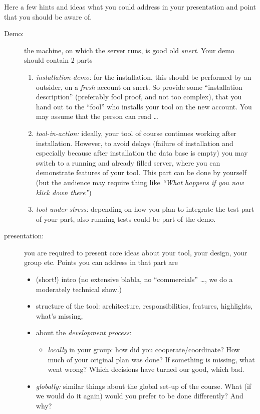 \documentclass[11pt,handout,nologo]{handout}
\begin{document}
Here a few hints and ideas what you could address in your presentation and
point that you should be aware of.

\begin{description}
\item[Demo:] the machine, on which the server runs, is good old
  \emph{snert}. Your demo should contain 2 parts
  \begin{enumerate}
  \item \emph{installation-demo:} for the installation, this should be
    performed by an outsider, on a \emph{fresh} account on snert. So
    provide some ``installation description'' (preferably fool proof, and
    not too complex), that you hand out to the ``fool'' who installs your
    tool on the new account. You may assume that the person can read \ldots
  \item \emph{tool-in-action:} ideally, your tool of course continues
    working after installation. However, to avoid delays (failure of
    installation and especially because after installation the data base is
    empty) you may switch to a running and already filled server, where you
    can demonstrate features of your tool. This part can be done by yourself
    (but the audience may require thing like \emph{``What happens if you
      now klick down there''})
  \item \emph{tool-under-stress:} depending on how you plan to integrate
    the test-part of your part, also running tests could be part of the
    demo.
  \end{enumerate}
\item[presentation:] you are required to present core ideas about your
  tool, your design, your group etc. Points you can address in that part are
  \begin{itemize}
  \item (short!) intro (no extensive blabla, no ``commercials'' \ldots, we
    do a moderately technical show.)
  \item structure of the tool: architecture, responsibilities, features,
    highlights, what's missing,
  \item about the \emph{development process}:
    \begin{itemize}
    \item \emph{locally} in your group: how did you cooperate/coordinate?
      How much of your original plan was done? If something is missing,
      what went wrong? Which decisions have turned our good, which bad.
    \end{itemize}
  \item \emph{globally:} similar things about the global set-up of the
    course. What (if we would do it again) would you prefer to be done
    differently? And why?
  \end{itemize}
\end{description}
\end{document}
